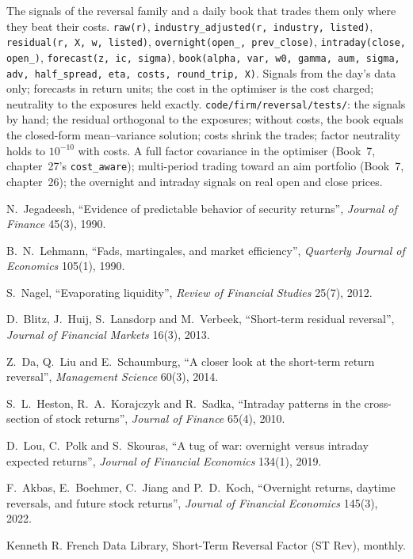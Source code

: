 \begin{build}
 The signals of the reversal family and a daily book that trades them only where they beat their costs.
 \texttt{raw(r)}, \texttt{industry\_adjusted(r, industry, listed)}, \texttt{residual(r, X, w, listed)}, \texttt{overnight(open\_,
prev\_close)}, \texttt{intraday(close, open\_)}, \texttt{forecast(z, ic, sigma)}, \texttt{book(alpha, var, w0, gamma, aum, sigma, adv, half\_spread, eta,
costs, round\_trip, X)}.
 Signals from the day's data only; forecasts in return units; the cost in the optimiser is the cost charged; neutrality to the exposures held
exactly.
 \texttt{code/firm/reversal/tests/}: the signals by hand; the residual orthogonal to the exposures; without costs, the book equals the
closed-form mean--variance solution; costs shrink the trades; factor neutrality holds to $10^{-10}$ with costs.
 A full factor covariance in the optimiser (Book~7, chapter~27's \texttt{cost\_aware}); multi-period trading toward an aim portfolio (Book~7,
chapter~26); the overnight and intraday signals on real open and close prices.
\end{build}

\begin{omsources}
\item N.~Jegadeesh, ``Evidence of predictable behavior of security returns'', \emph{Journal of Finance} 45(3), 1990.
\item B.~N.~Lehmann, ``Fads, martingales, and market efficiency'', \emph{Quarterly Journal of Economics} 105(1), 1990.
\item S.~Nagel, ``Evaporating liquidity'', \emph{Review of Financial Studies} 25(7), 2012.
\item D.~Blitz, J.~Huij, S.~Lansdorp and M.~Verbeek, ``Short-term residual reversal'', \emph{Journal of Financial Markets} 16(3), 2013.
\item Z.~Da, Q.~Liu and E.~Schaumburg, ``A closer look at the short-term return reversal'', \emph{Management Science} 60(3), 2014.
\item S.~L.~Heston, R.~A.~Korajczyk and R.~Sadka, ``Intraday patterns in the cross-section of stock returns'', \emph{Journal of Finance} 65(4), 2010.
\item D.~Lou, C.~Polk and S.~Skouras, ``A tug of war: overnight versus intraday expected returns'', \emph{Journal of Financial Economics} 134(1), 2019.
\item F.~Akbas, E.~Boehmer, C.~Jiang and P.~D.~Koch, ``Overnight returns, daytime reversals, and future stock returns'', \emph{Journal of Financial Economics}
145(3), 2022.
\item Kenneth R. French Data Library, Short-Term Reversal Factor (ST Rev), monthly.
\end{omsources}

